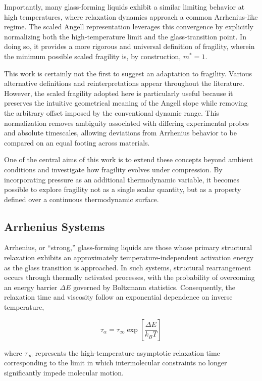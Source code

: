 Importantly, many glass-forming liquids exhibit a similar limiting behavior at high temperatures, where relaxation dynamics approach a common Arrhenius-like regime. The scaled Angell representation leverages this convergence by explicitly normalizing both the high-temperature limit and the glass-transition point. In doing so, it provides a more rigorous and universal definition of fragility, wherein the minimum possible scaled fragility is, by construction, $m^* = 1$.

This work is certainly not the first to suggest an adaptation to fragility. Various alternative definitions and reinterpretations appear throughout the literature. However, the scaled fragility adopted here is particularly useful because it preserves the intuitive geometrical meaning of the Angell slope while removing the arbitrary offset imposed by the conventional dynamic range. This normalization removes ambiguity associated with differing experimental probes and absolute timescales, allowing deviations from Arrhenius behavior to be compared on an equal footing across materials.

One of the central aims of this work is to extend these concepts beyond ambient conditions and investigate how fragility evolves under compression. By incorporating pressure as an additional thermodynamic variable, it becomes possible to explore fragility not as a single scalar quantity, but as a property defined over a continuous thermodynamic surface.

\subsection{Arrhenius Systems} \label{sec:Arrhenius}

Arrhenius, or ``strong,'' glass-forming liquids are those whose primary structural relaxation exhibits an approximately temperature-independent activation energy as the glass transition is approached. In such systems, structural rearrangement occurs through thermally activated processes, with the probability of overcoming an energy barrier $\Delta E$ governed by Boltzmann statistics. Consequently, the relaxation time and viscosity follow an exponential dependence on inverse temperature,

\begin{equation}
	\tau_\alpha=\tau_\infty  \exp\left [ \frac{\Delta E}{k_{B}T} \right ]
	\label{eqn:arrhenius}
\end{equation}

\noindent where $\tau_\infty$ represents the high-temperature asymptotic relaxation time corresponding to the limit in which intermolecular constraints no longer significantly impede molecular motion.

